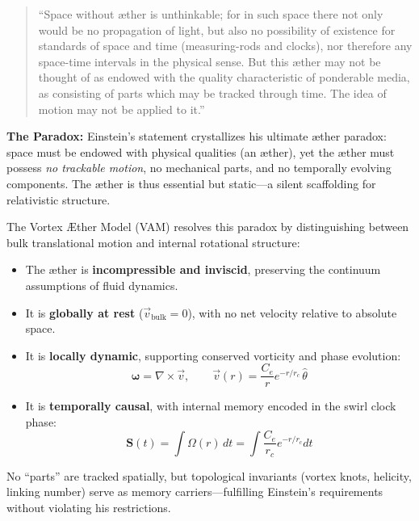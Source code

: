 
\vspace{1em}

\begin{tcolorbox}[
    title={Einstein’s Final Æther Statement (1920)},
    colback=gray!7!white,
    colframe=black,
    boxrule=0.6pt,
    sharp corners=southwest,
    fonttitle=\bfseries,
    breakable
]
\begin{quote}
\small
“Space without æther is unthinkable; for in such space there not only would be no propagation of light, but also no possibility of existence for standards of space and time (measuring-rods and clocks), nor therefore any space-time intervals in the physical sense. But this æther may not be thought of as endowed with the quality characteristic of ponderable media, as consisting of parts which may be tracked through time. The idea of motion may not be applied to it.”
\end{quote}
\end{tcolorbox}

\vspace{0.6em}
\noindent
\textbf{The Paradox:} Einstein’s statement crystallizes his ultimate æther paradox: space must be endowed with physical qualities (an æther), yet the æther must possess \emph{no trackable motion}, no mechanical parts, and no temporally evolving components. The æther is thus essential but static—a silent scaffolding for relativistic structure.

\vspace{1em}

\begin{tcolorbox}[
    title={VAM Resolution: Internal Motion Without Bulk Translation},
    colback=gray!4!white,
    colframe=black,
    boxrule=0.6pt,
    sharp corners=southwest,
    fonttitle=\bfseries,
    breakable
]
The Vortex Æther Model (VAM) resolves this paradox by distinguishing between bulk translational motion and internal rotational structure:
\begin{itemize}
    \item The æther is \textbf{incompressible and inviscid}, preserving the continuum assumptions of fluid dynamics.
    \item It is \textbf{globally at rest} (\( \vec{v}_{\text{bulk}} = 0 \)), with no net velocity relative to absolute space.
    \item It is \textbf{locally dynamic}, supporting conserved vorticity and phase evolution:
    \[
        \boldsymbol{\omega} = \nabla \times \vec{v}, \qquad
        \vec{v}(r) = \frac{C_e}{r} e^{-r/r_c} \, \hat{\theta}
    \]
    \item It is \textbf{temporally causal}, with internal memory encoded in the swirl clock phase:
    \[
        \boldsymbol{S}(t) = \int \Omega(r) \, dt = \int \frac{C_e}{r_c} e^{-r/r_c} dt
    \]
\end{itemize}
No “parts” are tracked spatially, but topological invariants (vortex knots, helicity, linking number) serve as memory carriers—fulfilling Einstein’s requirements without violating his restrictions.
\end{tcolorbox}

